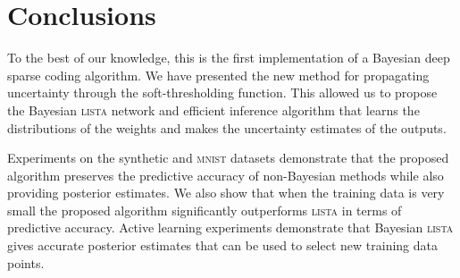 \documentclass{article}
\begin{document}
  \section{Conclusions}
  \label{sec:conclusions}
  To the best of our knowledge, this is the first implementation of a Bayesian deep sparse coding algorithm. %
  We have presented the new method for propagating uncertainty through the soft-thresholding function.
  This allowed us to propose the Bayesian \textsc{lista} network and efficient inference algorithm that learns the distributions of the weights and makes the uncertainty estimates of the outputs. %
  
  Experiments on the synthetic and \textsc{mnist} datasets demonstrate that the proposed algorithm preserves the predictive accuracy of non-Bayesian methods while also providing posterior estimates. We also show that when the training data is very small the proposed algorithm significantly outperforms \textsc{lista} in terms of predictive accuracy. Active learning experiments demonstrate that Bayesian \textsc{lista} gives accurate posterior estimates that can be used to select new training data points.
  


\end{document}
